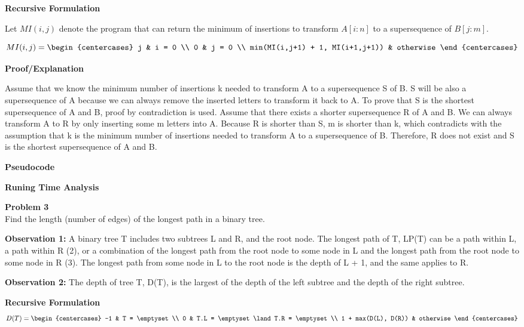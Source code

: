 \documentclass[12pt,article]{article}
\newenvironment{problem}[2][Problem]
    { \begin{mdframed}[backgroundcolor=gray!20] \textbf{#1 #2} \\}
    {  \end{mdframed}}
\begin{document}
\textbf{Recursive Formulation}

Let $MI(i,j)$ denote the program that can return the minimum of insertions to transform $A[i:n]$ to a supersequence of $B[j:m]$. 

\normalsize{
    \[
        MI(i,j)=
        \begin{centercases}
            j   & i = 0 \\
            0   & j = 0 \\
            min(MI(i,j+1) + 1, MI(i+1,j+1)) & otherwise
        \end{centercases}
        \]
}

\textbf{Proof/Explanation}

Assume that we know the minimum number of insertions k needed to transform A to a supersequence S of B. S will be also a supersequence of A because we can always remove the inserted letters to transform it back to A. To prove that S is the shortest supersequence of A and B, proof by contradiction is used. Assume that there exists a shorter supersequence R of A and B. We can always transform A to R by only inserting some m letters into A. Because R is shorter than S, m is shorter than k, which contradicts with the assumption that k is the minimum number of insertions needed to transform A to a supersequence of B. Therefore, R does not exist and S is the shortest supersequence of A and B.

\textbf{Pseudocode}

\textbf{Runing Time Analysis}

\newpage
\begin{problem}{3} 
Find the length (number of edges) of the longest path in a binary tree.
\end{problem}

\textbf{Observation 1:} A binary tree T includes two subtrees L and R, and the root node. The longest path of T, LP(T) can be a path within L, a path within R (2), or a combination of the longest path from the root node to some node in L and the longest path from the root node to some node in R (3). The longest path from some node in L to the root node is the depth of L + 1, and the same applies to R.

\textbf{Observation 2:} The depth of tree T, D(T), is the largest of the depth of the left subtree and the depth of the right subtree.

\textbf{Recursive Formulation}
\normalsize{
\[
    D(T)=
    \begin{centercases}
        -1   & T = \emptyset \\
        0    & T.L = \emptyset \land T.R = \emptyset \\
        1 + max(D(L), D(R)) & otherwise
    \end{centercases}
\]
}
\end{document}
